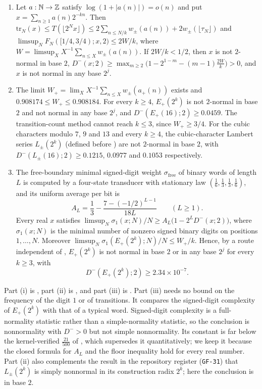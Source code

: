 \documentclass[11pt]{article}
\newcommand{\ttbreak}{\discretionary{}{}{}}
\newcommand{\ttt}[1]{\texttt{\begingroup\def\_{\textunderscore\ttbreak}#1\endgroup}}
\newcommand{\wpm}{w_{\pm}}
\newcommand{\tr}{\mathrm{tr}}
\newcommand{\sfree}{\sigma_{\mathrm{free}}}
\begin{document}
\begin{maintheorem}\label{thm:signed-main}
\begin{enumerate}[label=\textup{(\roman*)},nosep]
\item {} Let $a:\mathbb N\to\mathbb Z$ satisfy $\log(1+|a(n)|)=o(n)$ and put $x=\sum_{n\ge1}a(n)2^{-kn}$. Then $\tr_N(x)\le T(\lfloor2^Nx\rfloor)\le2\sum_{n\le N/k}\wpm(a(n))+2\wpm(\lfloor\tau_N\rfloor)$ and $\limsup_NF_N([1/4,3/4);x,2)\le2W/k$, where $W=\limsup_XX^{-1}\sum_{n\le X}\wpm(a(n))$. If $2W/k<1/2$, then $x$ is not $2$-normal in base $2$, $D^-(x;2)\ge\max_{m\ge2}\bigl(1-2^{1-m}-(m-1)\frac{2W}k\bigr)>0$, and $x$ is not normal in any base $2^j$.
\item {} The limit $W_+=\lim_XX^{-1}\sum_{n\le X}\wpm(a_+(n))$ exists and $0.908174\le W_+\le0.908184$. For every $k\ge4$, $E_+(2^k)$ is not $2$-normal in base $2$ and not normal in any base $2^j$, and $D^-(E_+(16);2)\ge0.0459$. The transition-count method cannot reach $k\le3$, since $W_+\ge3/4$. For the cubic characters modulo $7$, $9$ and $13$ and every $k\ge4$, the cubic-character Lambert series $L_\pm(2^k)$ (defined before ) are not $2$-normal in base $2$, with $D^-(L_\pm(16);2)\ge0.1215$, $0.0977$ and $0.1053$ respectively.
\item {} The free-boundary minimal signed-digit weight $\sfree$ of binary words of length $L$ is computed by a four-state transducer with stationary law $(\frac16,\frac13,\frac13,\frac16)$, and its uniform average per bit is
\[
A_L=\frac13-\frac{7-(-1/2)^{L-1}}{18L}\qquad(L\ge1).
\]
Every real $x$ satisfies $\limsup_N\sigma_1(x;N)/N\ge A_L\bigl(1-2^LD^-(x;2)\bigr)$, where $\sigma_1(x;N)$ is the minimal number of nonzero signed binary digits on positions $1,\dots,N$. Moreover $\limsup_N\sigma_1(E_+(2^k);N)/N\le W_+/k$. Hence, by a route independent of , $E_+(2^k)$ is not normal in base $2$ or in any base $2^j$ for every $k\ge3$, with
\[
D^-(E_+(2^k);2)\ge2.34\times10^{-7}.
\]
\end{enumerate}
\end{maintheorem}

Part (i) is , part (ii) is , and part (iii) is . Part (iii) needs no bound on the frequency of the digit $1$ or of transitions. It compares the signed-digit complexity of $E_+(2^k)$ with that of a typical word. Signed-digit complexity is a full-normality statistic rather than a simple-normality statistic, so the conclusion is nonnormality with $D^->0$ but not simple nonnormality. Its constant is far below the kernel-verified $\frac{21}{500}$ of , which supersedes it quantitatively; we keep it because the closed formula for $A_L$ and the floor inequality hold for every real number. Part (ii) also complements the result in the repository register (\ttt{GF-31}) that $L_\pm(2^k)$ is simply nonnormal in its construction radix $2^k$; here the conclusion is in base $2$.
\end{document}
